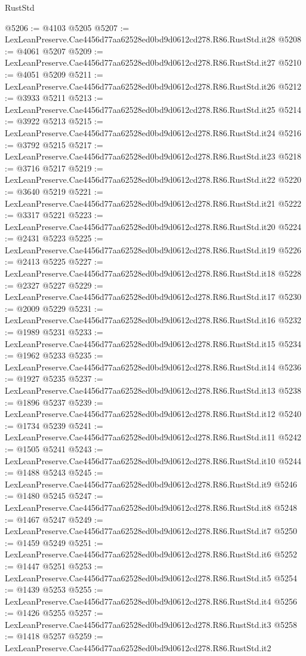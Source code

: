 \begin{lexlean}{RustStd}
\begin{coremodule}
@5206 := @4103 @5205
@5207 := LexLeanPreserve.Cae4456d77aa62528ed0bd9d0612cd278.R86.RustStd.it28
@5208 := @4061 @5207
@5209 := LexLeanPreserve.Cae4456d77aa62528ed0bd9d0612cd278.R86.RustStd.it27
@5210 := @4051 @5209
@5211 := LexLeanPreserve.Cae4456d77aa62528ed0bd9d0612cd278.R86.RustStd.it26
@5212 := @3933 @5211
@5213 := LexLeanPreserve.Cae4456d77aa62528ed0bd9d0612cd278.R86.RustStd.it25
@5214 := @3922 @5213
@5215 := LexLeanPreserve.Cae4456d77aa62528ed0bd9d0612cd278.R86.RustStd.it24
@5216 := @3792 @5215
@5217 := LexLeanPreserve.Cae4456d77aa62528ed0bd9d0612cd278.R86.RustStd.it23
@5218 := @3716 @5217
@5219 := LexLeanPreserve.Cae4456d77aa62528ed0bd9d0612cd278.R86.RustStd.it22
@5220 := @3640 @5219
@5221 := LexLeanPreserve.Cae4456d77aa62528ed0bd9d0612cd278.R86.RustStd.it21
@5222 := @3317 @5221
@5223 := LexLeanPreserve.Cae4456d77aa62528ed0bd9d0612cd278.R86.RustStd.it20
@5224 := @2431 @5223
@5225 := LexLeanPreserve.Cae4456d77aa62528ed0bd9d0612cd278.R86.RustStd.it19
@5226 := @2413 @5225
@5227 := LexLeanPreserve.Cae4456d77aa62528ed0bd9d0612cd278.R86.RustStd.it18
@5228 := @2327 @5227
@5229 := LexLeanPreserve.Cae4456d77aa62528ed0bd9d0612cd278.R86.RustStd.it17
@5230 := @2009 @5229
@5231 := LexLeanPreserve.Cae4456d77aa62528ed0bd9d0612cd278.R86.RustStd.it16
@5232 := @1989 @5231
@5233 := LexLeanPreserve.Cae4456d77aa62528ed0bd9d0612cd278.R86.RustStd.it15
@5234 := @1962 @5233
@5235 := LexLeanPreserve.Cae4456d77aa62528ed0bd9d0612cd278.R86.RustStd.it14
@5236 := @1927 @5235
@5237 := LexLeanPreserve.Cae4456d77aa62528ed0bd9d0612cd278.R86.RustStd.it13
@5238 := @1896 @5237
@5239 := LexLeanPreserve.Cae4456d77aa62528ed0bd9d0612cd278.R86.RustStd.it12
@5240 := @1734 @5239
@5241 := LexLeanPreserve.Cae4456d77aa62528ed0bd9d0612cd278.R86.RustStd.it11
@5242 := @1505 @5241
@5243 := LexLeanPreserve.Cae4456d77aa62528ed0bd9d0612cd278.R86.RustStd.it10
@5244 := @1488 @5243
@5245 := LexLeanPreserve.Cae4456d77aa62528ed0bd9d0612cd278.R86.RustStd.it9
@5246 := @1480 @5245
@5247 := LexLeanPreserve.Cae4456d77aa62528ed0bd9d0612cd278.R86.RustStd.it8
@5248 := @1467 @5247
@5249 := LexLeanPreserve.Cae4456d77aa62528ed0bd9d0612cd278.R86.RustStd.it7
@5250 := @1459 @5249
@5251 := LexLeanPreserve.Cae4456d77aa62528ed0bd9d0612cd278.R86.RustStd.it6
@5252 := @1447 @5251
@5253 := LexLeanPreserve.Cae4456d77aa62528ed0bd9d0612cd278.R86.RustStd.it5
@5254 := @1439 @5253
@5255 := LexLeanPreserve.Cae4456d77aa62528ed0bd9d0612cd278.R86.RustStd.it4
@5256 := @1426 @5255
@5257 := LexLeanPreserve.Cae4456d77aa62528ed0bd9d0612cd278.R86.RustStd.it3
@5258 := @1418 @5257
@5259 := LexLeanPreserve.Cae4456d77aa62528ed0bd9d0612cd278.R86.RustStd.it2

\end{coremodule}
\end{lexlean}
